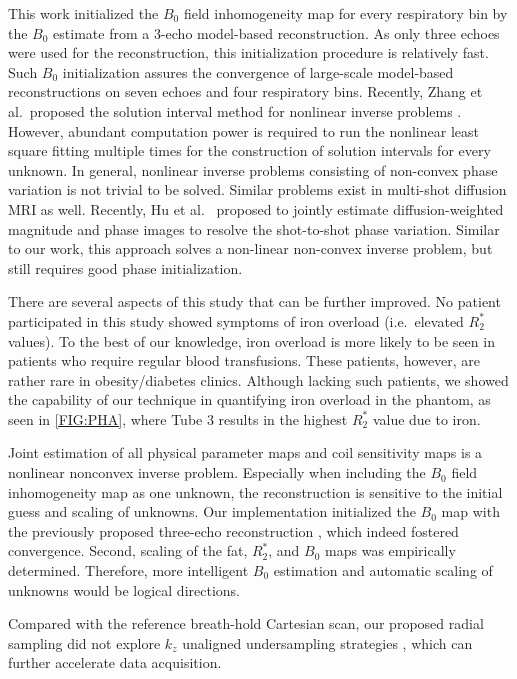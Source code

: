 \documentclass[journal,twoside,web]{ieeecolor}
\begin{document}
This work initialized the $B_0$ field inhomogeneity map for every respiratory bin 
by the $B_0$ estimate from a 3-echo model-based reconstruction. 
As only three echoes were used for the reconstruction, 
this initialization procedure is relatively fast. 
Such $B_0$ initialization assures the convergence of large-scale model-based reconstructions 
on seven echoes and four respiratory bins. 
Recently, Zhang et al.~proposed the solution interval method for nonlinear inverse problems 
\cite{zhang_2021_nlls_init}. 
However, abundant computation power is required to 
run the nonlinear least square fitting multiple times 
for the construction of solution intervals for every unknown.
In general, nonlinear inverse problems consisting of non-convex phase variation 
is not trivial to be solved. 
Similar problems exist in multi-shot diffusion MRI as well. 
Recently, Hu et al.~\cite{hu_2020_spa_llr} proposed to 
jointly estimate diffusion-weighted magnitude and phase images 
to resolve the shot-to-shot phase variation. 
Similar to our work, this approach solves a non-linear non-convex inverse problem, 
but still requires good phase initialization.

There are several aspects of this study that can be further improved. 
No patient participated in this study 
showed symptoms of iron overload (i.e.~elevated $R_2^*$ values). 
To the best of our knowledge, iron overload is more likely to be seen 
in patients who require regular blood transfusions. 
These patients, however, are rather rare in obesity/diabetes clinics. 
Although lacking such patients, we showed the capability of our technique in 
quantifying iron overload in the phantom, as seen in \cref{FIG:PHA}, 
where Tube 3 results in the highest $R_2^*$ value due to iron. 

Joint estimation of all physical parameter maps 
and coil sensitivity maps is a nonlinear nonconvex inverse problem. 
Especially when including the $B_0$ field inhomogeneity map as one unknown, 
the reconstruction is sensitive to the initial guess and scaling of unknowns. 
Our implementation initialized the $B_0$ map 
with the previously proposed three-echo reconstruction \cite{tan_2019_mobawf}, 
which indeed fostered convergence. 
Second, scaling of the fat, $R_2^*$, and $B_0$ maps was 
empirically determined. Therefore, more intelligent $B_0$ estimation 
and automatic scaling of unknowns \cite{tan_2017_scalemobaflow} 
would be logical directions. 

Compared with the reference breath-hold Cartesian scan, 
our proposed radial sampling did not explore 
$k_z$ unaligned undersampling strategies \cite{breuer_2005_caipi}, 
which can further accelerate data acquisition.
\end{document}

